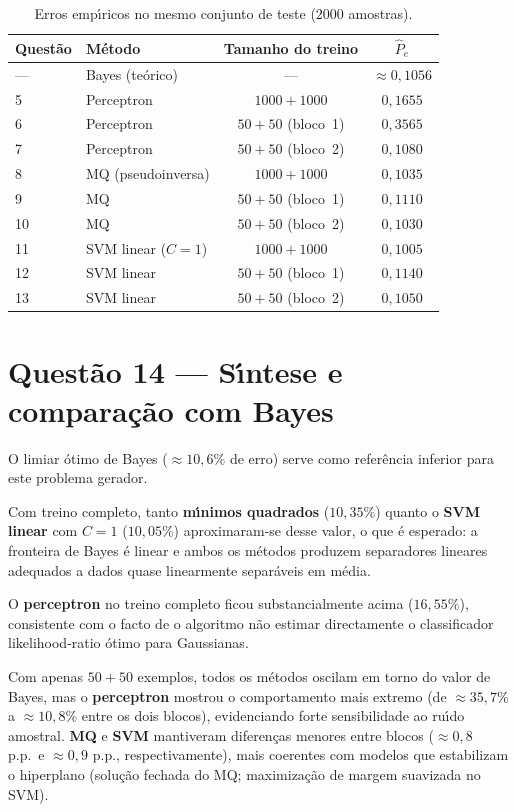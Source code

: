 \documentclass[12pt,a4paper]{article}
\begin{document}
\begin{table}[ht]
\centering
\begin{tabular}{@{}llcc@{}}
\toprule
\textbf{Quest\~ao} & \textbf{M\'etodo} & \textbf{Tamanho do treino} & $\hat P_e$ \\
\midrule
--- & Bayes (te\'orico) & --- & $\approx 0{,}1056$ \\
5 & Perceptron & $1000{+}1000$ & $0{,}1655$ \\
6 & Perceptron & $50{+}50$ (bloco~1) & $0{,}3565$ \\
7 & Perceptron & $50{+}50$ (bloco~2) & $0{,}1080$ \\
8 & MQ (pseudoinversa) & $1000{+}1000$ & $0{,}1035$ \\
9 & MQ & $50{+}50$ (bloco~1) & $0{,}1110$ \\
10 & MQ & $50{+}50$ (bloco~2) & $0{,}1030$ \\
11 & SVM linear ($C{=}1$) & $1000{+}1000$ & $0{,}1005$ \\
12 & SVM linear & $50{+}50$ (bloco~1) & $0{,}1140$ \\
13 & SVM linear & $50{+}50$ (bloco~2) & $0{,}1050$ \\
\bottomrule
\end{tabular}
\caption{Erros emp\'{\i}ricos no mesmo conjunto de teste ($2000$ amostras).}
\label{tab:resumo}
\end{table}

\section*{Quest\~ao 14 --- S\'{\i}ntese e compara\c{c}\~ao com Bayes}

O limiar \'otimo de Bayes ($\approx 10{,}6\%$ de erro) serve como refer\^encia inferior para este problema gerador.

Com treino completo, tanto \textbf{m\'{\i}nimos quadrados} ($10{,}35\%$) quanto o \textbf{SVM linear} com $C{=}1$ ($10{,}05\%$) aproximaram-se desse valor, o que \'e esperado: a fronteira de Bayes \'e linear e ambos os m\'etodos produzem separadores lineares adequados a dados quase linearmente separ\'aveis em m\'edia.

O \textbf{perceptron} no treino completo ficou substancialmente acima ($16{,}55\%$), consistente com o facto de o algoritmo n\~ao estimar directamente o classificador likelihood-ratio \'otimo para Gaussianas.

Com apenas $50{+}50$ exemplos, todos os m\'etodos oscilam em torno do valor de Bayes, mas o \textbf{perceptron} mostrou o comportamento mais extremo (de $\approx 35{,}7\%$ a $\approx 10{,}8\%$ entre os dois blocos), evidenciando forte sensibilidade ao ru\'{\i}do amostral.
\textbf{MQ} e \textbf{SVM} mantiveram diferen\c{c}as menores entre blocos ($\approx 0{,}8$ p.p.\ e $\approx 0{,}9$ p.p., respectivamente), mais coerentes com modelos que estabilizam o hiperplano (solu\c{c}\~ao fechada do MQ; maximiza\c{c}\~ao de margem suavizada no SVM).
\end{document}
